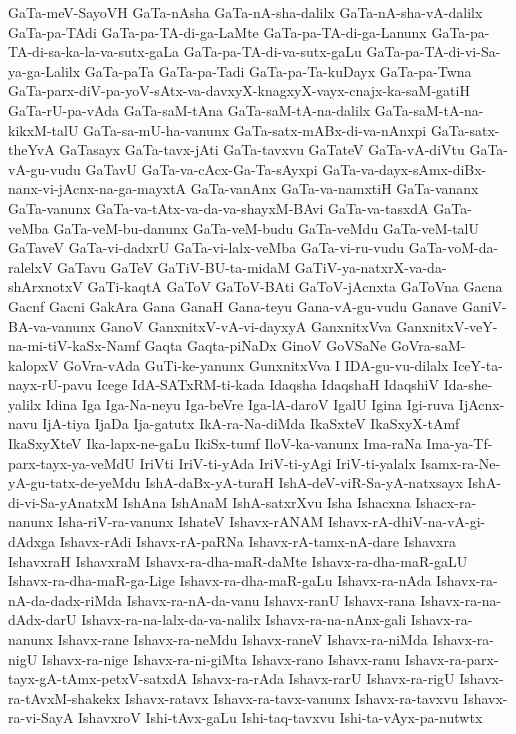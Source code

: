 {GaTa-meV-SayoVH
GaTa-nAsha
GaTa-nA-sha-dalilx
GaTa-nA-sha-vA-dalilx
GaTa-pa-TAdi
GaTa-pa-TA-di-ga-LaMte
GaTa-pa-TA-di-ga-Lanunx
GaTa-pa-TA-di-sa-ka-la-va-sutx-gaLa
GaTa-pa-TA-di-va-sutx-gaLu
GaTa-pa-TA-di-vi-Sa-ya-ga-Lalilx
GaTa-paTa
GaTa-pa-Tadi
GaTa-pa-Ta-kuDayx
GaTa-pa-Twna
GaTa-parx-diV-pa-yoV-sAtx-va-davxyX-knagxyX-vayx-cnajx-ka-saM-gatiH
GaTa-rU-pa-vAda
GaTa-saM-tAna
GaTa-saM-tA-na-dalilx
GaTa-saM-tA-na-kikxM-talU
GaTa-sa-mU-ha-vanunx
GaTa-satx-mABx-di-va-nAnxpi
GaTa-satx-theYvA
GaTasayx
GaTa-tavx-jAti
GaTa-tavxvu
GaTateV
GaTa-vA-diVtu
GaTa-vA-gu-vudu
GaTavU
GaTa-va-cAcx-Ga-Ta-sAyxpi
GaTa-va-dayx-sAmx-diBx-nanx-vi-jAcnx-na-ga-mayxtA
GaTa-vanAnx
GaTa-va-namxtiH
GaTa-vananx
GaTa-vanunx
GaTa-va-tAtx-va-da-va-shayxM-BAvi
GaTa-va-tasxdA
GaTa-veMba
GaTa-veM-bu-danunx
GaTa-veM-budu
GaTa-veMdu
GaTa-veM-talU
GaTaveV
GaTa-vi-dadxrU
GaTa-vi-lalx-veMba
GaTa-vi-ru-vudu
GaTa-voM-da-ralelxV
GaTavu
GaTeV
GaTiV-BU-ta-midaM
GaTiV-ya-natxrX-va-da-shArxnotxV
GaTi-kaqtA
GaToV
GaToV-BAti
GaToV-jAcnxta
GaToVna
Gacna
Gacnf
Gacni
GakAra
Gana
GanaH
Gana-teyu
Gana-vA-gu-vudu
Ganave
GaniV-BA-va-vanunx
GanoV
GanxnitxV-vA-vi-dayxyA
GanxnitxVva
GanxnitxV-veY-na-mi-tiV-kaSx-Namf
Gaqta
Gaqta-piNaDx
GinoV
GoVSaNe
GoVra-saM-kalopxV
GoVra-vAda
GuTi-ke-yanunx
GunxnitxVva
I
IDA-gu-vu-dilalx
IceY-ta-nayx-rU-pavu
Icege
IdA-SATxRM-ti-kada
Idaqsha
IdaqshaH
IdaqshiV
Ida-she-yalilx
Idina
Iga
Iga-Na-neyu
Iga-beVre
Iga-lA-daroV
IgalU
Igina
Igi-ruva
IjAcnx-navu
IjA-tiya
IjaDa
Ija-gatutx
IkA-ra-Na-diMda
IkaSxteV
IkaSxyX-tAmf
IkaSxyXteV
Ika-lapx-ne-gaLu
IkiSx-tumf
IloV-ka-vanunx
Ima-raNa
Ima-ya-Tf-parx-tayx-ya-veMdU
IriVti
IriV-ti-yAda
IriV-ti-yAgi
IriV-ti-yalalx
Isamx-ra-Ne-yA-gu-tatx-de-yeMdu
IshA-daBx-yA-turaH
IshA-deV-viR-Sa-yA-natxsayx
IshA-di-vi-Sa-yAnatxM
IshAna
IshAnaM
IshA-satxrXvu
Isha
Ishacxna
Ishacx-ra-nanunx
Isha-riV-ra-vanunx
IshateV
Ishavx-rANAM
Ishavx-rA-dhiV-na-vA-gi-dAdxga
Ishavx-rAdi
Ishavx-rA-paRNa
Ishavx-rA-tamx-nA-dare
Ishavxra
IshavxraH
IshavxraM
Ishavx-ra-dha-maR-daMte
Ishavx-ra-dha-maR-gaLU
Ishavx-ra-dha-maR-ga-Lige
Ishavx-ra-dha-maR-gaLu
Ishavx-ra-nAda
Ishavx-ra-nA-da-dadx-riMda
Ishavx-ra-nA-da-vanu
Ishavx-ranU
Ishavx-rana
Ishavx-ra-na-dAdx-darU
Ishavx-ra-na-lalx-da-va-nalilx
Ishavx-ra-na-nAnx-gali
Ishavx-ra-nanunx
Ishavx-rane
Ishavx-ra-neMdu
Ishavx-raneV
Ishavx-ra-niMda
Ishavx-ra-nigU
Ishavx-ra-nige
Ishavx-ra-ni-giMta
Ishavx-rano
Ishavx-ranu
Ishavx-ra-parx-tayx-gA-tAmx-petxV-satxdA
Ishavx-ra-rAda
Ishavx-rarU
Ishavx-ra-rigU
Ishavx-ra-tAvxM-shakekx
Ishavx-ratavx
Ishavx-ra-tavx-vanunx
Ishavx-ra-tavxvu
Ishavx-ra-vi-SayA
IshavxroV
Ishi-tAvx-gaLu
Ishi-taq-tavxvu
Ishi-ta-vAyx-pa-nutwtx
}
